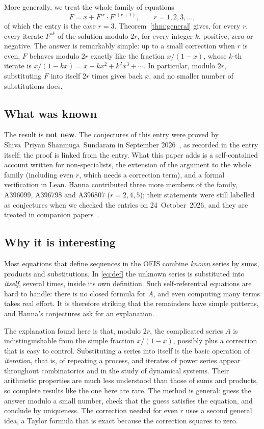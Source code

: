 \documentclass[11pt,a4paper]{article}
\theoremstyle{definition}
\theoremstyle{remark}
\begin{document}
More generally, we treat the whole family of equations
\[
F=x+F^{\circ r}\cdot F^{\circ(r+1)},\qquad r=1,2,3,\dots,
\]
of which the entry is the case $r=3$. Theorem~\ref{thm:general} gives, for every $r$, every
iterate $F^{\circ k}$ of the solution modulo $2r$, for every integer $k$, positive, zero or negative. The answer is
remarkably simple: up to a small correction when $r$ is even, $F$ behaves modulo $2r$ exactly like the fraction
$x/(1-x)$, whose $k$-th iterate is $x/(1-kx)=x+kx^2+k^2x^3+\cdots$. In particular, modulo $2r$, substituting $F$ into
itself $2r$ times gives back $x$, and no smaller number of substitutions does.

\subsection{What was known}
The result is \textbf{not new}. The conjectures of this entry were proved by Shiva~Priyan
Shanmuga~Sundaram in September 2026~\cite{sundaram}, as recorded in the entry itself; the proof is linked from the
entry. What this paper adds is a self-contained account written for
non-specialists, the extension of the argument to the whole family (including even $r$, which needs a correction
term), and a formal verification in Lean. Hanna contributed three more members of the family, A396099, A396798 and
A396807 ($r=2,4,5$); their statements were still labelled as conjectures when we checked the entries on 24~October~2026, and they are
treated in companion papers~\cite{repo}.

\subsection{Why it is interesting}
Most equations that define sequences in the OEIS combine \emph{known} series by sums, products and substitutions.
In \eqref{eq:def} the unknown series is substituted into \emph{itself}, several times, inside its own definition.
Such self-referential equations are hard to handle: there is no closed formula for $A$, and even computing many terms
takes real effort. It is therefore striking that the remainders have simple patterns, and Hanna's conjectures ask
for an explanation.

The explanation found here is that, modulo $2r$, the complicated series $A$ is indistinguishable from the simple
fraction $x/(1-x)$, possibly plus a correction that is easy to control. Substituting a series into itself is the
basic operation of \emph{iteration}, that is, of repeating a process, and iterates of power series appear throughout
combinatorics and in the study of dynamical systems. Their arithmetic properties are much less understood than those
of sums and products, so complete results like the one here are rare. The method is general: guess the answer modulo
a small number, check that the guess satisfies the equation, and conclude by uniqueness. The correction needed for
even $r$ uses a second general idea, a Taylor formula that is exact because the correction squares to zero.
\end{document}

